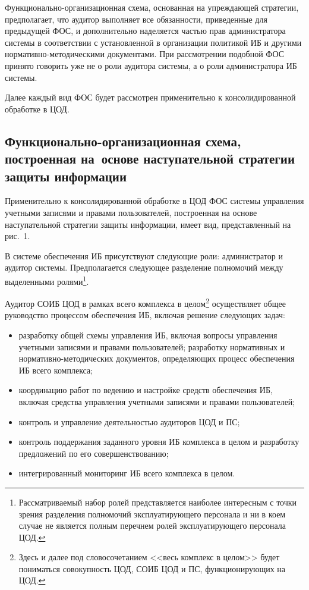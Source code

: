 \begin{multicols}{2}
       Функционально-организационная схема, основанная на упреж\-да\-ющей стратегии, предполагает, что аудитор 
выполняет все обязанности, приведенные для предыдущей ФОС, и дополнительно наделяется частью прав администратора 
сис\-те\-мы в соответствии с уста\-нов\-лен\-ной в организации политикой ИБ и другими 
нор\-ма\-тив\-но-ме\-то\-ди\-че\-ски\-ми документами. При рассмотрении подобной 
ФОС принято говорить уже не о 
роли аудитора сис\-те\-мы, а о роли администратора ИБ сис\-темы.
       
Далее каждый вид ФОС будет  рассмотрен применительно к консолидированной обработке в ЦОД.

\subsection{Функционально-организационная схема, 
построенная на~основе наступательной стратегии защиты информации}
       
       Применительно к консолидированной обработке в ЦОД ФОС сис\-те\-мы 
управления учетными записями и правами пользователей, построенная на основе 
наступательной стратегии защиты информации, имеет вид, представленный на рис.~1. 
       
       
       В системе обеспечения ИБ присутствуют следующие роли: администратор и 
аудитор сис\-те\-мы. Предполагается следующее разделение полномочий между 
выделенными ролями\footnote{Рассматриваемый набор ролей представляется наиболее 
интересным с точки зрения разделения полномочий эксплуатирующего персонала и ни в коем 
случае не является полным перечнем ролей эксплуатирующего персонала ЦОД.}.
       
       Аудитор СОИБ ЦОД в рамках всего комплекса в целом\footnote[2]{Здесь и далее под 
словосочетанием <<весь комплекс в целом>> будет пониматься совокупность ЦОД, СОИБ ЦОД и 
ПС, функционирующих на ЦОД.} осуществляет общее руководство процессом обеспечения 
ИБ, включая решение следующих задач:
       \begin{itemize}
\item разработку общей схемы управления ИБ, включая 
вопросы управления учетными записями и правами пользователей;
разработку нормативных и нор\-ма\-тив\-но-ме\-то\-ди\-че\-ских документов, определяющих 
процесс обеспечения ИБ всего комплекса;
\item координацию работ по ведению и настройке средств обеспечения ИБ, включая 
средства управления учетными записями и правами пользователей;
\item контроль и управление деятельностью аудиторов ЦОД и ПС;
\item  контроль поддержания заданного уровня ИБ комплекса в целом и разработку 
предложений по его совершенствованию;
\item интегрированный мониторинг ИБ всего комплекса в целом.
\end{itemize}


\end{multicols}
